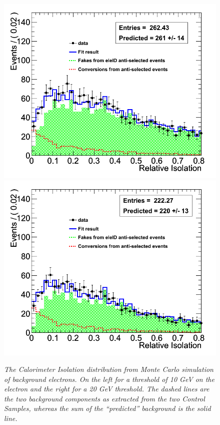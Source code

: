 \begin{figure}[h!]
\centering
\includegraphics[scale=0.32]{Plots/caloIso_pt10_fit.png}
\includegraphics[scale=0.32]{Plots/caloIso_pt20_fit.png}
\caption{\textit{The Calorimeter Isolation distribution from Monte Carlo simulation of background electrons. On the left for a threshold of 10 GeV on the electron and the right for a 20 GeV threshold.  The dashed lines are the two background components as extracted from the two Control Samples, whereas the sum of the ``predicted'' background is the solid line.}}\label{fig:caloIso_fit}
\end{figure}

